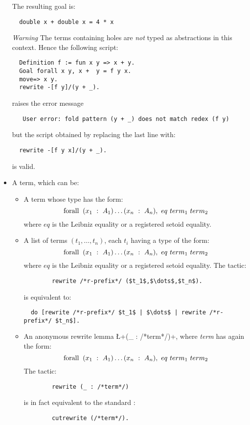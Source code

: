 \begin{itemize}
The resulting goal is:

\begin{lstlisting}
  double x + double x = 4 * x
\end{lstlisting}

\emph{Warning} The \ssr{} terms containing holes are \emph{not}
typed as abstractions in this context. Hence the following script:
\begin{lstlisting}
  Definition f := fun x y => x + y.
  Goal forall x y, x +  y = f y x.
  move=> x y.
  rewrite -[f y]/(y + _).
\end{lstlisting}
raises the error message
\begin{verbatim}
   User error: fold pattern (y + _) does not match redex (f y)
\end{verbatim}
but the script obtained by replacing the last line with:
\begin{lstlisting}
  rewrite -[f y x]/(y + _).
\end{lstlisting}
is valid.


\item A term, which can be:
  \begin{itemize}
    \item A term whose type has the form:
      $$\C{forall}\ (x_1\ :\ A_1)\dots(x_n\ :\ A_n),\ eq\ term_1\ term_2$$
      where $eq$ is the Leibniz equality or a registered setoid
      equality. %
    \item A list of terms $(t_1,\dots,t_n)$, each $t_i$ having a type of the
      form: $$\C{forall}\ (x_1\ :\ A_1)\dots(x_n\ :\ A_n),\ eq\ term_1\ term_2$$ where
      $eq$ is the Leibniz equality or a registered setoid
      equality. The tactic:
      \begin{lstlisting}
        rewrite /*r-prefix*/ ($t_1$,$\dots$,$t_n$).
      \end{lstlisting}
      is equivalent to:
\begin{lstlisting}
  do [rewrite /*r-prefix*/ $t_1$ | $\dots$ | rewrite /*r-prefix*/ $t_n$].
\end{lstlisting}
    \item An anonymous rewrite lemma
      \L+(_ : /*term*/)+, where \textit{term} has again the form:
      $$\C{forall}\ (x_1\ :\ A_1)\dots(x_n\ :\ A_n),\ eq\ term_1\ term_2$$
      The tactic:
      \begin{lstlisting}
        rewrite (_ : /*term*/)
      \end{lstlisting}
      is in fact equivalent to the standard \Coq{}:
      \begin{lstlisting}
        cutrewrite (/*term*/).
      \end{lstlisting}

  \end{itemize}

\end{itemize}




